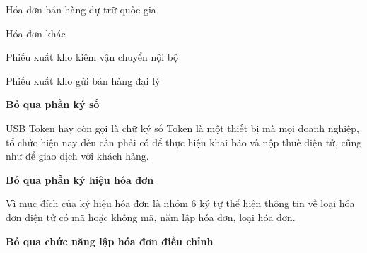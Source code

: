 Hóa đơn bán hàng dự trữ quốc gia













Hóa đơn khác













Phiếu xuất kho kiêm vận chuyển nội bộ













Phiếu xuất kho gửi bán hàng đại lý













\textbf{Bỏ qua phần ký số}













USB Token hay còn gọi là chữ ký số Token là một thiết bị mà mọi doanh nghiệp, tổ chức hiện nay đều cần phải có để thực hiện khai báo và nộp thuế điện tử, cũng như để giao dịch với khách hàng.













\textbf{Bỏ qua phần ký hiệu hóa đơn  }






Vì   mục đích của ký hiệu hóa đơn      là nhóm 6 ký tự   thể hiện      thông tin về loại hóa đơn điện tử có mã   hoặc   không mã, năm lập hóa đơn, loại hóa đơn.






\textbf{Bỏ qua chức năng   lập hóa đơn điều chỉnh  }







